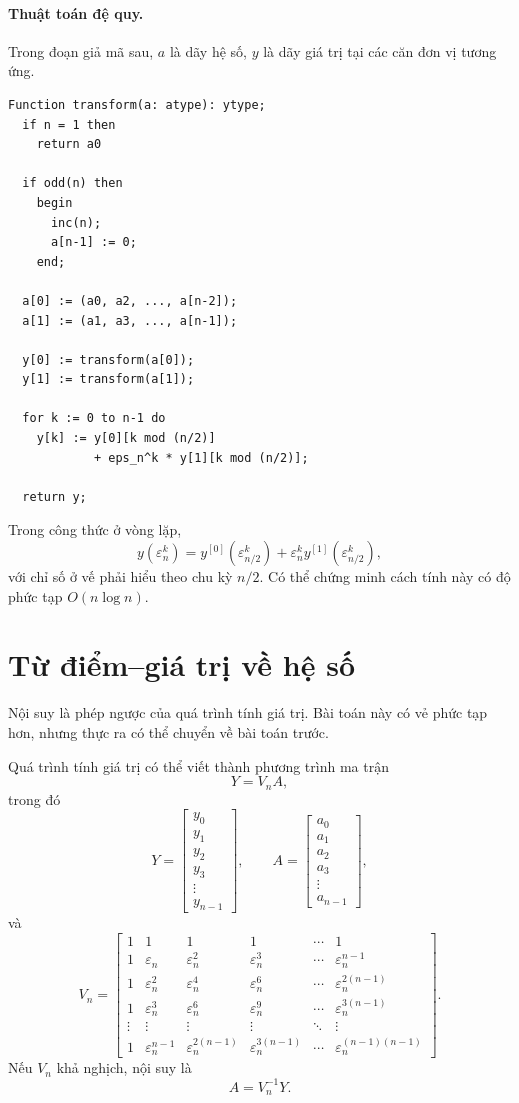 \documentclass[11pt]{article}
\newcommand{\eps}{\varepsilon}
\begin{document}
\paragraph{Thuật toán đệ quy.}
Trong đoạn giả mã sau, \(a\) là dãy hệ số, \(y\) là dãy giá trị tại các căn
đơn vị tương ứng.
\begin{verbatim}
Function transform(a: atype): ytype;
  if n = 1 then
    return a0

  if odd(n) then
    begin
      inc(n);
      a[n-1] := 0;
    end;

  a[0] := (a0, a2, ..., a[n-2]);
  a[1] := (a1, a3, ..., a[n-1]);

  y[0] := transform(a[0]);
  y[1] := transform(a[1]);

  for k := 0 to n-1 do
    y[k] := y[0][k mod (n/2)]
            + eps_n^k * y[1][k mod (n/2)];

  return y;
\end{verbatim}
Trong công thức ở vòng lặp,
\[
  y(\eps_n^k)
  =y^{[0]}(\eps_{n/2}^k)+\eps_n^k y^{[1]}(\eps_{n/2}^k),
\]
với chỉ số ở vế phải hiểu theo chu kỳ \(n/2\). Có thể chứng minh cách tính
này có độ phức tạp \(O(n\log n)\).

\section{Từ điểm--giá trị về hệ số}

Nội suy là phép ngược của quá trình tính giá trị. Bài toán này có vẻ phức
tạp hơn, nhưng thực ra có thể chuyển về bài toán trước.

Quá trình tính giá trị có thể viết thành phương trình ma trận
\[
  Y=V_nA,
\]
trong đó
\[
Y=
\begin{bmatrix}
y_0\\ y_1\\ y_2\\ y_3\\ \vdots\\ y_{n-1}
\end{bmatrix},
\qquad
A=
\begin{bmatrix}
a_0\\ a_1\\ a_2\\ a_3\\ \vdots\\ a_{n-1}
\end{bmatrix},
\]
và
\[
V_n=
\begin{bmatrix}
1 & 1 & 1 & 1 & \cdots & 1\\
1 & \eps_n & \eps_n^2 & \eps_n^3 & \cdots & \eps_n^{n-1}\\
1 & \eps_n^2 & \eps_n^4 & \eps_n^6 & \cdots & \eps_n^{2(n-1)}\\
1 & \eps_n^3 & \eps_n^6 & \eps_n^9 & \cdots & \eps_n^{3(n-1)}\\
\vdots & \vdots & \vdots & \vdots & \ddots & \vdots\\
1 & \eps_n^{n-1} & \eps_n^{2(n-1)} & \eps_n^{3(n-1)}
  & \cdots & \eps_n^{(n-1)(n-1)}
\end{bmatrix}.
\]
Nếu \(V_n\) khả nghịch, nội suy là
\[
  A=V_n^{-1}Y.
\]
\end{document}

